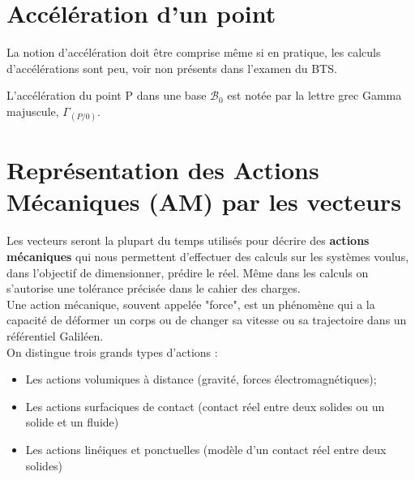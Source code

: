 \documentclass[
	11pt, %
	fleqn, %
	a4paper, %
]{LegrandOrangeBook}
\begin{document}
\section{Accélération d'un point}
La notion d'accélération doit être comprise même si en pratique, les calculs d'accélérations sont peu, voir non présents dans l'examen du BTS. 

L’accélération du point P dans une base $\mathcal{B}_0$ est notée par la lettre grec Gamma majuscule, $\Gamma_{(P/0)}$.





\section{Représentation des Actions Mécaniques (AM) par les vecteurs}

Les vecteurs seront la plupart du temps utilisés pour décrire des \textbf{actions mécaniques} qui nous permettent d'effectuer des calculs sur les systèmes voulus, dans l'objectif de dimensionner, prédire le réel. Même dans les calculs on s'autorise une tolérance précisée dans le cahier des charges. \\

Une action mécanique, souvent appelée "force", est un phénomène qui a la capacité de déformer un corps ou de changer sa vitesse ou sa trajectoire dans un référentiel Galiléen.\\

On distingue trois grands types d’actions :
\begin{itemize}
    \item Les actions volumiques à distance (gravité, forces électromagnétiques);
    \item Les actions surfaciques de contact (contact réel entre deux solides ou un solide et un fluide)
    \item Les actions linéiques et ponctuelles (modèle d’un contact réel entre deux solides)
\end{itemize}
\end{document}
